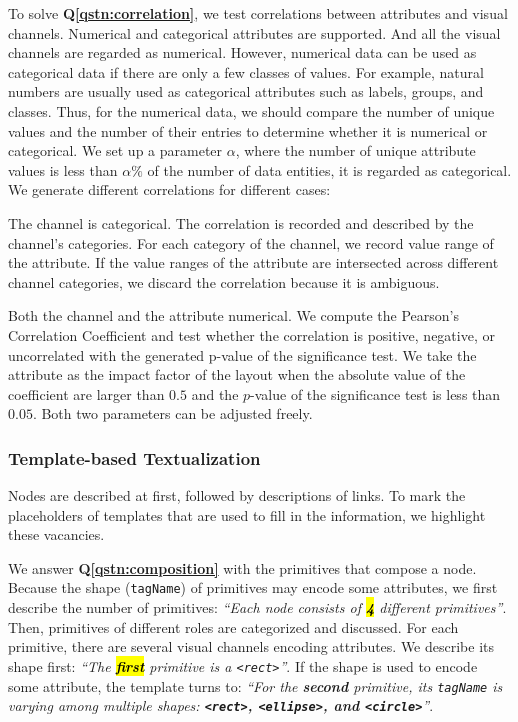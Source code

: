 To solve \textbf{Q\ref{qstn:correlation}}, we test correlations between attributes and visual channels.
Numerical and categorical attributes are supported.
And all the visual channels are regarded as numerical.
However, numerical data can be used as categorical data if there are only a few classes of values.
For example, natural numbers are usually used as categorical attributes such as labels, groups, and classes.
Thus, for the numerical data, we should compare the number of unique values and the number of their entries to determine whether it is numerical or categorical.
We set up a parameter $\alpha$, where the number of unique attribute values is less than $\alpha \%$ of the number of data entities, it is regarded as categorical.
We generate different correlations for different cases:
\begin{compactitem}
    \item The channel is categorical. The correlation is recorded and described by the channel's categories. For each category of the channel, we record value range of the attribute. %
    If the value ranges of the attribute are intersected across different channel categories, we discard the correlation because it is ambiguous.
    \item Both the channel and the attribute numerical. We compute the Pearson's Correlation Coefficient and test whether the correlation is positive, negative, or uncorrelated with the generated p-value of the significance test. We take the attribute as the impact factor of the layout when the absolute value of the coefficient are larger than $0.5$ and the $p$-value of the significance test is less than $0.05$. 
    Both two parameters can be adjusted freely.
\end{compactitem}


\subsubsection {Template-based Textualization}
Nodes are described at first, followed by descriptions of links. 
To mark the placeholders of templates that are used to fill in the information, we highlight these vacancies.

We answer \textbf{Q\ref{qstn:composition}} with the primitives that compose a node.
Because the shape (\texttt{tagName}) of primitives may encode some attributes, we first describe the number of primitives:
\textit{``Each node consists of \textbf{\color{white}\hl{ 4 }} different primitives''}. 
Then, primitives of different roles are categorized and discussed. 
For each primitive, there are several visual channels encoding attributes.
We describe its shape first: \textit{``The \textbf{\color{white}\hl{ first }} primitive is a {\color{text-highlight}\texttt{<rect>}}''}.
If the shape is used to encode some attribute, the template turns to: \textit{``For the \textbf{\color{text-highlight}second} primitive, its \texttt{tagName} is varying among multiple shapes: \textbf{\color{text-highlight}\texttt{<rect>}, \texttt{<ellipse>}, and \texttt{<circle>}}''}.

